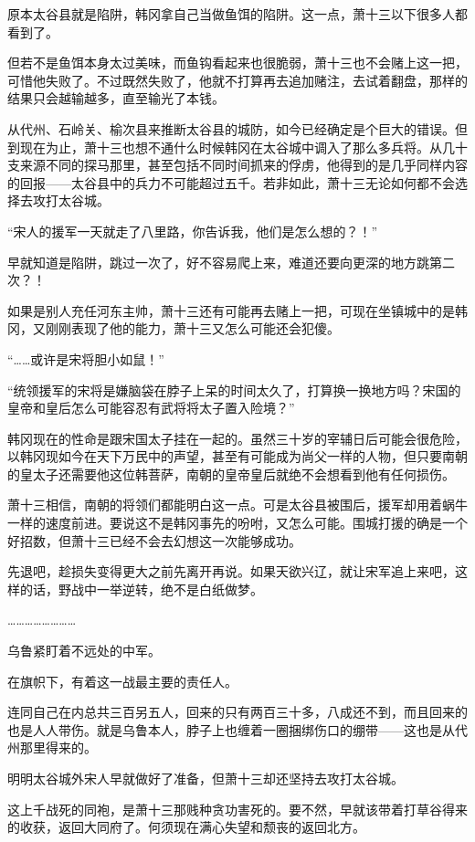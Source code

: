 原本太谷县就是陷阱，韩冈拿自己当做鱼饵的陷阱。这一点，萧十三以下很多人都看到了。

但若不是鱼饵本身太过美味，而鱼钩看起来也很脆弱，萧十三也不会赌上这一把，可惜他失败了。不过既然失败了，他就不打算再去追加赌注，去试着翻盘，那样的结果只会越输越多，直至输光了本钱。

从代州、石岭关、榆次县来推断太谷县的城防，如今已经确定是个巨大的错误。但到现在为止，萧十三也想不通什么时候韩冈在太谷城中调入了那么多兵将。从几十支来源不同的探马那里，甚至包括不同时间抓来的俘虏，他得到的是几乎同样内容的回报——太谷县中的兵力不可能超过五千。若非如此，萧十三无论如何都不会选择去攻打太谷城。

“宋人的援军一天就走了八里路，你告诉我，他们是怎么想的？！”

早就知道是陷阱，跳过一次了，好不容易爬上来，难道还要向更深的地方跳第二次？！

如果是别人充任河东主帅，萧十三还有可能再去赌上一把，可现在坐镇城中的是韩冈，又刚刚表现了他的能力，萧十三又怎么可能还会犯傻。

“……或许是宋将胆小如鼠！”

“统领援军的宋将是嫌脑袋在脖子上呆的时间太久了，打算换一换地方吗？宋国的皇帝和皇后怎么可能容忍有武将将太子置入险境？”

韩冈现在的性命是跟宋国太子挂在一起的。虽然三十岁的宰辅日后可能会很危险，以韩冈现如今在天下万民中的声望，甚至有可能成为尚父一样的人物，但只要南朝的皇太子还需要他这位韩菩萨，南朝的皇帝皇后就绝不会想看到他有任何损伤。

萧十三相信，南朝的将领们都能明白这一点。可是太谷县被围后，援军却用着蜗牛一样的速度前进。要说这不是韩冈事先的吩咐，又怎么可能。围城打援的确是一个好招数，但萧十三已经不会去幻想这一次能够成功。

先退吧，趁损失变得更大之前先离开再说。如果天欲兴辽，就让宋军追上来吧，这样的话，野战中一举逆转，绝不是白纸做梦。

……………………

乌鲁紧盯着不远处的中军。

在旗帜下，有着这一战最主要的责任人。

连同自己在内总共三百另五人，回来的只有两百三十多，八成还不到，而且回来的也是人人带伤。就是乌鲁本人，脖子上也缠着一圈捆绑伤口的绷带——这也是从代州那里得来的。

明明太谷城外宋人早就做好了准备，但萧十三却还坚持去攻打太谷城。

这上千战死的同袍，是萧十三那贱种贪功害死的。要不然，早就该带着打草谷得来的收获，返回大同府了。何须现在满心失望和颓丧的返回北方。


